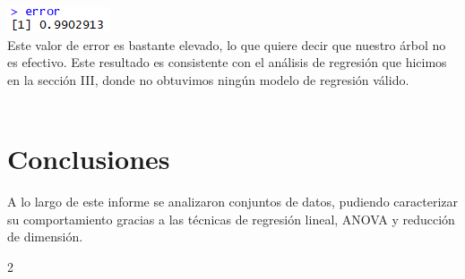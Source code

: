 \documentclass[twoside]{article}
\begin{document}
\begin{multicols}{2}
\includegraphics[scale=0.7]{images/pic_40.png}\\

Este valor de error es bastante elevado, lo que quiere decir que nuestro \'arbol no es efectivo. Este resultado es consistente con el an\'alisis de regresi\'on que hicimos en la secci\'on III, donde no obtuvimos ning\'un modelo de regresi\'on v\'alido.\\\\



\section{Conclusiones}
A lo largo de este informe se analizaron conjuntos de datos, pudiendo caracterizar su comportamiento gracias a las t\'ecnicas de regresi\'on lineal, ANOVA y reducci\'on de dimensi\'on.

\end{multicols}{2}
\end{document}
